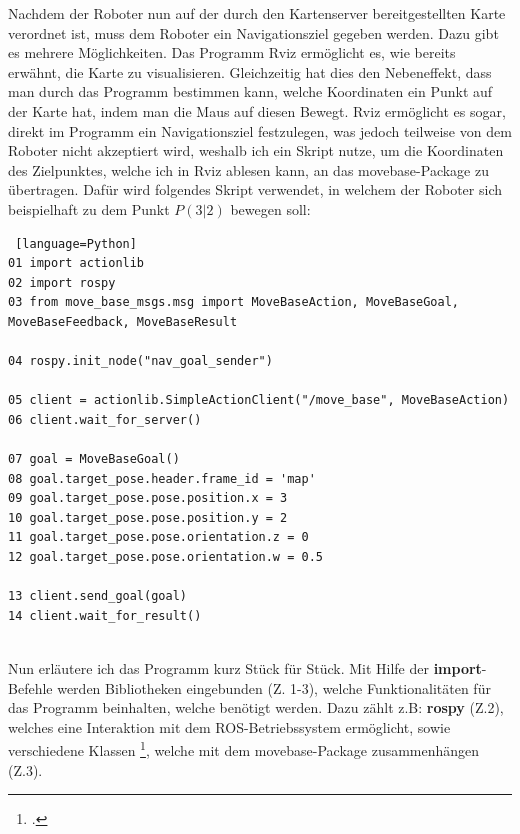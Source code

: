 {{			Nachdem der Roboter nun auf der durch den Kartenserver bereitgestellten Karte verordnet ist, muss dem Roboter ein Navigationsziel gegeben werden.
			Dazu gibt es mehrere Möglichkeiten. Das Programm Rviz ermöglicht es, wie bereits erwähnt, die Karte zu visualisieren. Gleichzeitig hat dies den Nebeneffekt, dass man durch das Programm bestimmen kann, welche Koordinaten ein Punkt auf der Karte hat, indem man die Maus auf diesen Bewegt. Rviz ermöglicht es sogar, direkt im Programm ein Navigationsziel festzulegen, was jedoch teilweise von dem Roboter nicht akzeptiert wird, weshalb ich ein Skript nutze, um die Koordinaten des Zielpunktes, welche ich in Rviz ablesen kann, an das move\textunderscore base-Package zu übertragen.
			Dafür wird folgendes Skript verwendet, in welchem der Roboter sich beispielhaft zu dem Punkt $P(3|2)$ bewegen soll:
			\newline  %
			
			\lstset{
				breaklines = true,
				frame = single,
				numbers = none
			}
			\begin{lstlisting} [language=Python]
01 import actionlib
02 import rospy
03 from move_base_msgs.msg import MoveBaseAction, MoveBaseGoal,   MoveBaseFeedback, MoveBaseResult
				
04 rospy.init_node("nav_goal_sender")
				
05 client = actionlib.SimpleActionClient("/move_base", MoveBaseAction)
06 client.wait_for_server()
				
07 goal = MoveBaseGoal()
08 goal.target_pose.header.frame_id = 'map' 
09 goal.target_pose.pose.position.x = 3
10 goal.target_pose.pose.position.y = 2
11 goal.target_pose.pose.orientation.z = 0
12 goal.target_pose.pose.orientation.w = 0.5
				
13 client.send_goal(goal)
14 client.wait_for_result()
				
			\end{lstlisting}
			Nun erläutere ich das Programm kurz Stück für Stück.
			Mit Hilfe der \textbf{import}-Befehle werden Bibliotheken eingebunden (Z. 1-3), welche Funktionalitäten für das Programm beinhalten, welche benötigt werden. Dazu zählt z.B: \textbf{rospy} (Z.2), welches eine Interaktion mit dem ROS-Betriebssystem ermöglicht, sowie verschiedene Klassen  \footcite{Programmierung: Ansammmlung von wiederverwandbaren Funktionen (eines Aufgabenbereiches)}, welche mit dem move\textunderscore base-Package zusammenhängen (Z.3).
			
}}
